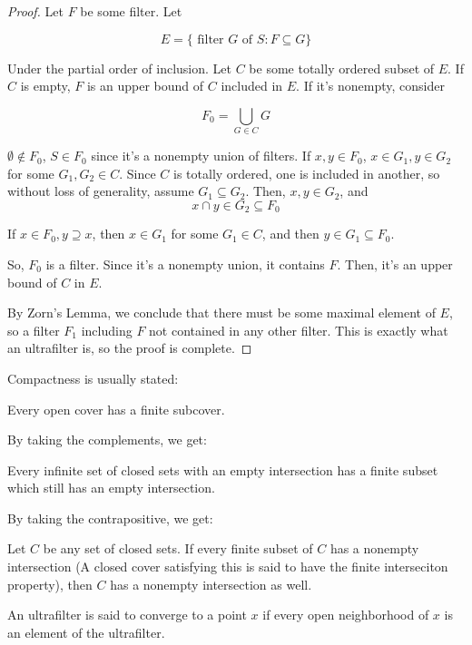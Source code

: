 \documentclass{article}
\begin{document}
        \begin{proof}
        Let $F$ be some filter. Let

        \[E = \{\text{ filter } G \text{ of } S: F \subseteq G\}\]

        Under the partial order of inclusion. Let $C$ be some totally ordered
        subset of $E$. If $C$ is empty, $F$ is an upper bound of $C$ included in
        $E$. If it's nonempty, consider

        \[F_0 = \bigcup_{G \in C} G\]

        $\emptyset \notin F_0$, $S \in F_0$ since it's a nonempty union of
        filters. If $x, y \in F_0$, $x \in G_1, y \in G_2$ for some $G_1, G_2
        \in C$. Since $C$ is totally ordered, one is included in another, so
        without loss of generality, assume $G_1 \subseteq G_2$. Then, $x,y \in
        G_2$, and \[x \cap y \in G_2 \subseteq F_0\]

        If $x \in F_0, y \supseteq x$, then $x \in G_1$ for some $G_1 \in C$,
        and then $y \in G_1 \subseteq F_0$.

        So, $F_0$ is a filter. Since it's a nonempty union, it contains $F$.
        Then, it's an upper bound of $C$ in $E$.

        By Zorn's Lemma, we conclude that there must be some maximal element of
        $E$, so a filter $F_1$ including $F$ not contained in any other filter.
        This is exactly what an ultrafilter is, so the proof is complete.
        \end{proof}

        Compactness is usually stated:

        Every open cover has a finite subcover.

        By taking the complements, we get:

        Every infinite set of closed sets with an empty intersection has a
        finite subset which still has an empty intersection.

        By taking the contrapositive, we get:

        Let $C$ be any set of closed sets. If every finite subset of $C$ has
        a nonempty intersection (A closed cover satisfying this is said to have
        the finite interseciton property), then $C$ has a nonempty intersection
        as well.

        An ultrafilter is said to converge to a point $x$ if every open
        neighborhood of $x$ is an element of the ultrafilter.
\end{document}

